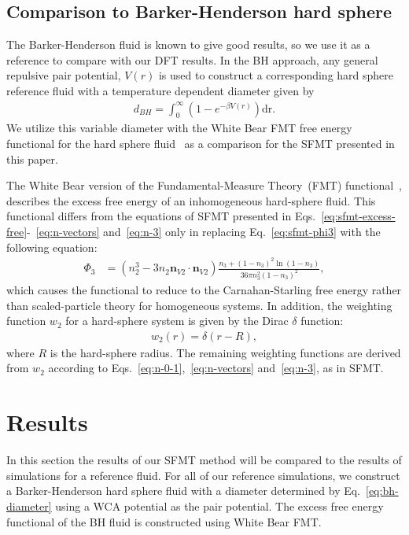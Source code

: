 \documentclass[letterpaper,twocolumn,amsmath,amssymb,prb]{revtex4-1}
\begin{document}
\subsection{Comparison to Barker-Henderson hard sphere}

The Barker-Henderson fluid is known to give good results, so we use it 
as a reference to compare with our DFT results. 
In the BH approach, any general
repulsive pair potential, $V(r)$ is used to construct a corresponding hard
sphere reference fluid with a temperature dependent diameter given by
\begin{align}
  d_{BH} = \int_0^{\infty}\left( 1 - e^{-\beta V(r)} \right)\mathrm{dr}.
  \label{eq:bh-diameter}
\end{align}
We utilize this variable diameter with the White Bear FMT free energy
functional for the hard sphere fluid~\cite{roth2002whitebear} as a
comparison for the SFMT presented in this paper.

The White Bear version of the Fundamental-Measure Theory~(FMT)
functional~\cite{roth2002whitebear}, describes the excess free energy
of an inhomogeneous hard-sphere fluid.  This functional differs
from the equations of SFMT presented in
Eqs.~\ref{eq:sfmt-excess-free}-~\ref{eq:n-vectors} and~\ref{eq:n-3} only in replacing
Eq.~\ref{eq:sfmt-phi3} with the following equation:
\begin{align}
\Phi_3 &= (n_2^3 - 3 n_2 \mathbf{n}_{V2} \cdot \mathbf{n}_{V2}) \frac{
  n_3 + (1-n_3)^2 \ln(1-n_3)
}{
  36\pi n_3^2\left( 1 - n_3 \right)^2
} , 
\end{align}
which causes the functional to reduce to the Carnahan-Starling free
energy rather than scaled-particle theory for homogeneous systems. In
addition, the weighting function $w_2$ for a hard-sphere system is
given by the Dirac $\delta$ function:
\begin{align}
  w_2(r) = \delta(r - R),
\end{align}
where $R$ is the hard-sphere radius. The remaining weighting
functions are derived from $w_2$ according to
Eqs.~\ref{eq:n-0-1},~\ref{eq:n-vectors} and~\ref{eq:n-3}, as in SFMT.

\section{Results}
In this section the results of our SFMT method will be compared to the results of simulations for a reference fluid.
For all of our reference simulations, we construct a Barker-Henderson hard
sphere fluid with a diameter determined by Eq.~\ref{eq:bh-diameter}
using a WCA potential as the pair potential. The excess free energy functional of the 
BH fluid is constructed using White Bear FMT. %
\end{document}
